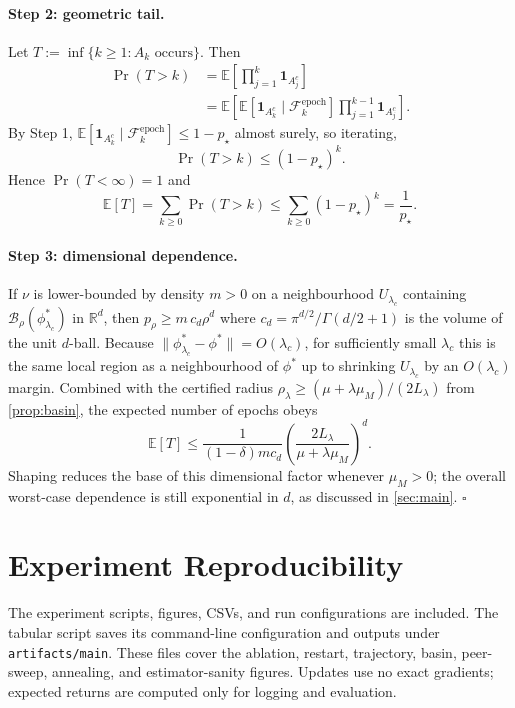 \documentclass{nextgame2026} %
\newcommand{\E}{\mathbb{E}}
\newcommand{\R}{\mathbb{R}}
\newcommand{\B}{\mathcal{B}}
\newcommand{\F}{\mathcal{F}}
\begin{document}
\paragraph{Step 2: geometric tail.}
Let $T:=\inf\{k\ge 1:A_k\text{ occurs}\}$. Then
\[
\begin{aligned}
\Pr(T>k)
&=\E\!\left[\prod_{j=1}^k\mathbf{1}_{A_j^c}\right]\\
&=\E\!\left[
\E[\mathbf{1}_{A_k^c}\mid\F_k^{\mathrm{epoch}}]
\prod_{j=1}^{k-1}\mathbf{1}_{A_j^c}\right].
\end{aligned}
\]
By Step 1, $\E[\mathbf{1}_{A_k^c}\mid\F_k^{\mathrm{epoch}}]\le 1-p_\star$ almost surely, so iterating,
\[
\Pr(T>k)\le (1-p_\star)^k.
\]
Hence $\Pr(T<\infty)=1$ and
\[
\E[T]=\sum_{k\ge 0}\Pr(T>k)\le \sum_{k\ge 0}(1-p_\star)^k=\frac{1}{p_\star}.
\]

\paragraph{Step 3: dimensional dependence.}
If $\nu$ is lower-bounded by density $m>0$ on a neighbourhood $U_{\lambda_c}$ containing $\B_\rho(\phi^\ast_{\lambda_c})$ in $\R^d$, then $p_\rho\ge m\,c_d\rho^d$ where $c_d=\pi^{d/2}/\Gamma(d/2+1)$ is the volume of the unit $d$-ball. Because $\|\phi^\ast_{\lambda_c}-\phi^\ast\|=O(\lambda_c)$, for sufficiently small $\lambda_c$ this is the same local region as a neighbourhood of $\phi^\ast$ up to shrinking $U_{\lambda_c}$ by an $O(\lambda_c)$ margin. Combined with the certified radius $\rho_\lambda\ge (\mu+\lambda\mu_M)/(2L_\lambda)$ from \cref{prop:basin}, the expected number of epochs obeys
\[
\E[T]\le \frac{1}{(1-\delta)m c_d}\!\left(\frac{2L_\lambda}{\mu+\lambda\mu_M}\right)^{\!d}.
\]
Shaping reduces the base of this dimensional factor whenever $\mu_M>0$; the overall worst-case dependence is still exponential in $d$, as discussed in \cref{sec:main}. $\square$

\section{Experiment Reproducibility}\label{app:repro}

The experiment scripts, figures, CSVs, and run configurations are included. The tabular script saves its command-line configuration and outputs under \texttt{artifacts/main}. These files cover the ablation, restart, trajectory, basin, peer-sweep, annealing, and estimator-sanity figures. Updates use no exact gradients; expected returns are computed only for logging and evaluation.
\end{document}
